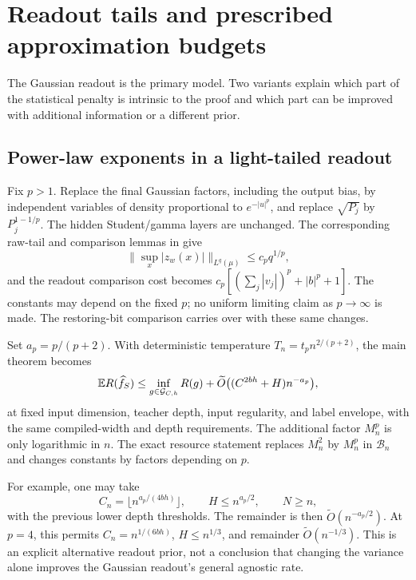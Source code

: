 \section{Readout tails and prescribed approximation budgets}
\label{sec:raw-extensions}
The Gaussian readout is the primary model.  Two variants explain which
part of the statistical penalty is intrinsic to the proof and which part
can be improved with additional information or a different prior.

\subsection{Power-law exponents in a light-tailed readout}
Fix $p>1$.  Replace the final Gaussian factors, including the output bias,
by independent variables of density proportional to $e^{-|u|^p}$, and
replace $\sqrt{P_j}$ by $P_j^{1-1/p}$.  The hidden Student/gamma layers
are unchanged.  The corresponding raw-tail and comparison lemmas in
\cite{rawprior} give
\[
 \|\sup_x|z_w(x)|\|_{L^q(\mu)}\le c_pq^{1/p},
\]
and the readout comparison cost becomes
$c_p[(\sum_j|v_j|)^p+|b|^p+1]$.
The constants may depend on the fixed $p$; no uniform limiting claim as
$p\to\infty$ is made.  The restoring-bit comparison carries over with
these same changes.

Set $a_p=p/(p+2)$.  With deterministic temperature
$T_n=t_p n^{2/(p+2)}$, the main theorem becomes
\[
 \mathbb E R(\widehat f_S)\le\inf_{g\in\mathcal G_{C,h}}R(g)
 +\widetilde O\big((C^{2bh}+H)n^{-a_p}\big),
\]
at fixed input dimension, teacher depth, input regularity, and label
envelope, with the same compiled-width and depth requirements.  The
additional factor $M_n^p$ is only logarithmic in $n$.  The exact resource
statement replaces $M_n^2$ by $M_n^p$ in $\mathcal B_n$ and changes
constants by factors depending on $p$.

For example, one may take
\[
 C_n=\lfloor n^{a_p/(4bh)}\rfloor,\qquad
 H\le n^{a_p/2},\qquad N\ge n,
\]
with the previous lower depth thresholds.  The remainder is then
$\widetilde O(n^{-a_p/2})$.  At $p=4$, this permits
$C_n=n^{1/(6bh)}$, $H\le n^{1/3}$, and remainder
$\widetilde O(n^{-1/3})$.  This is an explicit alternative readout prior,
not a conclusion that changing the variance alone improves the Gaussian
readout's general agnostic rate.

